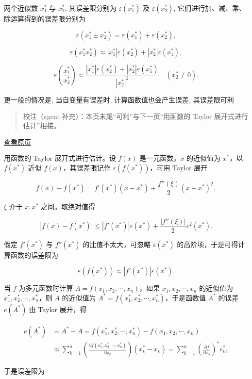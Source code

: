 \documentclass[
  10pt,
  fontset=fandol]{ctexart}
\begin{document}
两个近似数 \(x_1^*\) 与 \(x_2^*\), 其误差限分别为 \(\varepsilon(x_1^*)\) 及 \(\varepsilon(x_2^*)\), 它们进行加、减、乘、除运算得到的误差限分别为

\[
\varepsilon(x_1^* \pm x_2^*) = \varepsilon(x_1^*) + \varepsilon(x_2^*),
\]

\[
\varepsilon(x_1^* x_2^*) \approx |x_1^*| \varepsilon(x_2^*) + |x_2^*| \varepsilon(x_1^*),
\]

\[
\varepsilon\left(\frac{x_1^*}{x_2^*}\right) \approx \frac{|x_1^*| \varepsilon(x_2^*) + |x_2^*| \varepsilon(x_1^*)}{|x_2^*|^2} \quad (x_2^* \neq 0).
\]

更一般的情况是, 当自变量有误差时, 计算函数值也会产生误差, 其误差限可利

\begin{quote}
校注（agent 补充）：本页末尾``可利''与下一页``用函数的 Taylor 展开式进行估计''相接。
\end{quote}

\href{../../source-images/pdf-021.jpeg}{查看原页}

用函数的 Taylor 展开式进行估计。设 \(f(x)\) 是一元函数，\(x\) 的近似值为 \(x^*\)，以 \(f(x^*)\) 近似 \(f(x)\)，其误差限记作 \(\varepsilon(f(x^*))\)，可用 Taylor 展开

\[
f(x)-f(x^*)=f'(x^*)(x-x^*)+\frac{f''(\xi)}{2}(x-x^*)^2,
\]

\(\xi\) 介于 \(x,x^*\) 之间。取绝对值得

\[
|f(x)-f(x^*)|\leqslant |f'(x^*)|\varepsilon(x^*)+\frac{|f''(\xi)|}{2}\varepsilon^2(x^*).
\]

假定 \(f'(x^*)\) 与 \(f''(x^*)\) 的比值不太大，可忽略 \(\varepsilon(x^*)\) 的高阶项，于是可得计算函数的误差限为

\[
\varepsilon(f(x^*))\approx |f'(x^*)|\varepsilon(x^*).
\]

当 \(f\) 为多元函数时计算 \(A=f(x_1,x_2,\cdots,x_n)\)，如果 \(x_1,x_2,\cdots,x_n\) 的近似值为 \(x_1^*,x_2^*,\cdots,x_n^*\)，则 \(A\) 的近似值为 \(A^*=f(x_1^*,x_2^*,\cdots,x_n^*)\)，于是函数值 \(A^*\) 的误差 \(e(A^*)\) 由 Taylor 展开，得

\[
\begin{aligned}
e(A^*)&=A^*-A=f(x_1^*,x_2^*,\cdots,x_n^*)-f(x_1,x_2,\cdots,x_n)\\
&\approx\sum_{k=1}^{n}\left(\frac{\partial f(x_1^*,x_2^*,\cdots,x_n^*)}{\partial x_k}\right)(x_k^*-x_k)
=\sum_{k=1}^{n}\left(\frac{\partial f}{\partial x_k}\right)^*e_k^*,
\end{aligned}
\]

于是误差限为
\end{document}
